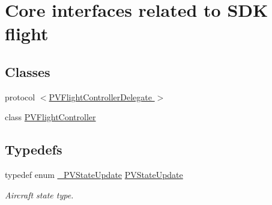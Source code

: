 \hypertarget{group___p_v_s_d_k___c_o_r_e___a_p_i___f_l_i_g_h_t_c_o_n_t_r_o_l}{}\section{Core interfaces related to S\+DK flight}
\label{group___p_v_s_d_k___c_o_r_e___a_p_i___f_l_i_g_h_t_c_o_n_t_r_o_l}
\subsection*{Classes}
\begin{DoxyCompactItemize}
\item 
protocol \hyperlink{protocol_p_v_flight_controller_delegate_01-p}{$<$\+P\+V\+Flight\+Controller\+Delegate $>$}
\item 
class \hyperlink{interface_p_v_flight_controller}{P\+V\+Flight\+Controller}
\end{DoxyCompactItemize}
\subsection*{Typedefs}
\begin{DoxyCompactItemize}
\item 
typedef enum \hyperlink{group___p_v_s_d_k___c_o_r_e___a_p_i___f_l_i_g_h_t_c_o_n_t_r_o_l_gac2647b170e41660f72f222422ba72be9}{\+\_\+\+P\+V\+State\+Update} \hyperlink{group___p_v_s_d_k___c_o_r_e___a_p_i___f_l_i_g_h_t_c_o_n_t_r_o_l_gaaf80ecddbee0e6e86c8c72925a6cf1f0}{P\+V\+State\+Update}
\begin{DoxyCompactList}\small\item\em Aircraft state type. \end{DoxyCompactList}\end{DoxyCompactItemize}

